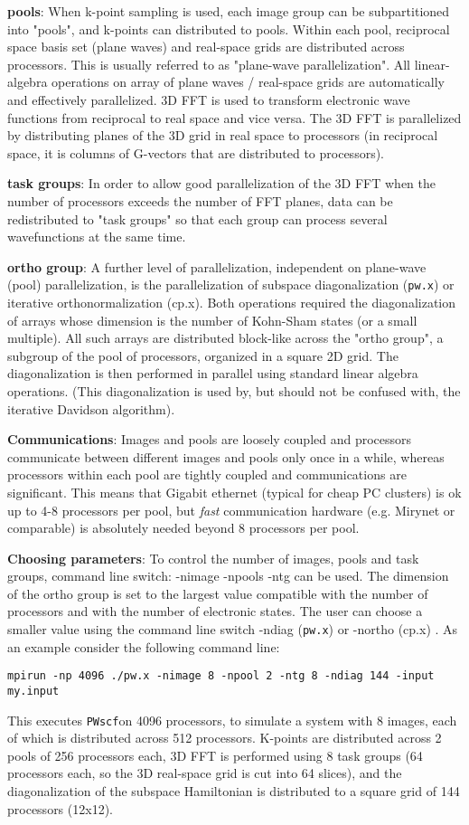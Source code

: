 \documentclass[12pt,a4paper]{article}
\def\pw.x{\texttt{pw.x}}
\def\PWscf{\texttt{PWscf}}
\begin{document}
{\bf pools}: When k-point sampling is used, each image group can be 
subpartitioned into "pools", and k-points can distributed to pools.
Within each pool, reciprocal space basis set (plane waves)
and real-space grids are distributed across processors.
This is usually referred to as "plane-wave parallelization".
All linear-algebra operations on array of  plane waves / 
real-space grids are automatically and effectively parallelized.
3D FFT is used to transform electronic wave functions from
reciprocal to real space and vice versa. The 3D FFT is
parallelized by distributing planes of the 3D grid in real
space to processors (in reciprocal space, it is columns of
G-vectors that are distributed to processors). 

{\bf task groups}: 
In order to allow good parallelization of the 3D FFT when 
the number of processors exceeds the number of FFT planes,
data can be redistributed to "task groups" so that each group 
can process several wavefunctions at the same time.

{\bf ortho group}:
A further level of parallelization, independent on
plane-wave (pool) parallelization, is the parallelization of
subspace diagonalization (\pw.x) or iterative orthonormalization
(cp.x). Both operations required the diagonalization of 
arrays whose dimension is the number of Kohn-Sham states
(or a small multiple). All such arrays are distributed block-like
across the "ortho group", a subgroup of the pool of processors,
organized in a square 2D grid. The diagonalization is then performed
in parallel using standard linear algebra operations. 
(This diagonalization is used by, but should not be confused with,
the iterative Davidson algorithm).

{\bf Communications}:
Images and pools are loosely coupled and processors communicate
between different images and pools only once in a while, whereas
processors within each pool are tightly coupled and communications
are significant. This means that Gigabit ethernet (typical for
cheap PC clusters) is ok up to 4-8 processors per pool, but {\em fast}
communication hardware (e.g. Mirynet or comparable) is absolutely 
needed beyond 8 processors per pool.

{\bf Choosing parameters}:
To control the number of images, pools and task groups,
command line switch: -nimage -npools -ntg can be used.
The dimension of the ortho group is set to the largest
value compatible with the number of processors and with
the number of electronic states. The user can choose a smaller
value using the command line switch -ndiag (\pw.x) or -northo (cp.x) .
As an example consider the following command line:
\begin{verbatim}
mpirun -np 4096 ./pw.x -nimage 8 -npool 2 -ntg 8 -ndiag 144 -input my.input
\end{verbatim}
This executes \PWscf on 4096 processors, to simulate a system
with 8 images, each of which is distributed across 512 processors.
K-points are distributed across 2 pools of 256 processors each, 
3D FFT is performed using 8 task groups (64 processors each, so
the 3D real-space grid is cut into 64 slices), and the diagonalization
of the subspace Hamiltonian is distributed to a square grid of 144
processors (12x12).
\end{document}
